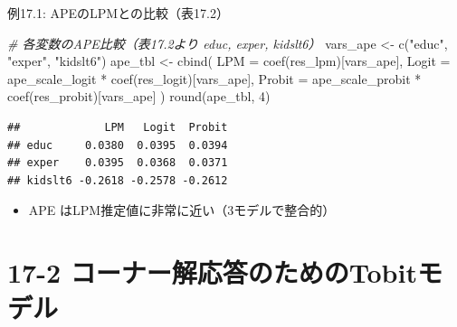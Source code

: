 \documentclass[
  ignorenonframetext,
]{beamer}
\newenvironment{Shaded}{\begin{snugshade}}{\end{snugshade}}
\newcommand{\AttributeTok}[1]{\textcolor[rgb]{0.77,0.63,0.00}{#1}}
\newcommand{\CommentTok}[1]{\textcolor[rgb]{0.56,0.35,0.01}{\textit{#1}}}
\newcommand{\DecValTok}[1]{\textcolor[rgb]{0.00,0.00,0.81}{#1}}
\newcommand{\FunctionTok}[1]{\textcolor[rgb]{0.00,0.00,0.00}{#1}}
\newcommand{\NormalTok}[1]{#1}
\newcommand{\OtherTok}[1]{\textcolor[rgb]{0.56,0.35,0.01}{#1}}
\newcommand{\SpecialCharTok}[1]{\textcolor[rgb]{0.00,0.00,0.00}{#1}}
\newcommand{\StringTok}[1]{\textcolor[rgb]{0.31,0.60,0.02}{#1}}
\providecommand{\tightlist}{%
  \setlength{\itemsep}{0pt}\setlength{\parskip}{0pt}}
\begin{document}
\begin{frame}[fragile]{例17.1: APEのLPMとの比較（表17.2）}
\protect\hypertarget{ux4f8b17.1-apeux306elpmux3068ux306eux6bd4ux8f03ux886817.2}{}
\footnotesize

\begin{Shaded}
\begin{Highlighting}[]
\CommentTok{\# 各変数のAPE比較（表17.2より educ, exper, kidslt6）}
\NormalTok{vars\_ape }\OtherTok{\textless{}{-}} \FunctionTok{c}\NormalTok{(}\StringTok{"educ"}\NormalTok{, }\StringTok{"exper"}\NormalTok{, }\StringTok{"kidslt6"}\NormalTok{)}
\NormalTok{ape\_tbl }\OtherTok{\textless{}{-}} \FunctionTok{cbind}\NormalTok{(}
  \AttributeTok{LPM    =} \FunctionTok{coef}\NormalTok{(res\_lpm)[vars\_ape],}
  \AttributeTok{Logit  =}\NormalTok{ ape\_scale\_logit  }\SpecialCharTok{*} \FunctionTok{coef}\NormalTok{(res\_logit)[vars\_ape],}
  \AttributeTok{Probit =}\NormalTok{ ape\_scale\_probit }\SpecialCharTok{*} \FunctionTok{coef}\NormalTok{(res\_probit)[vars\_ape]}
\NormalTok{)}
\FunctionTok{round}\NormalTok{(ape\_tbl, }\DecValTok{4}\NormalTok{)}
\end{Highlighting}
\end{Shaded}

\begin{verbatim}
##             LPM   Logit  Probit
## educ     0.0380  0.0395  0.0394
## exper    0.0395  0.0368  0.0371
## kidslt6 -0.2618 -0.2578 -0.2612
\end{verbatim}

\normalsize

\begin{itemize}
\tightlist
\item
  APE はLPM推定値に非常に近い（3モデルで整合的）
\end{itemize}
\end{frame}

\hypertarget{ux30b3ux30fcux30caux30fcux89e3ux5fdcux7b54ux306eux305fux3081ux306etobitux30e2ux30c7ux30eb}{%
\section{17-2
コーナー解応答のためのTobitモデル}\label{ux30b3ux30fcux30caux30fcux89e3ux5fdcux7b54ux306eux305fux3081ux306etobitux30e2ux30c7ux30eb}}
\end{document}
